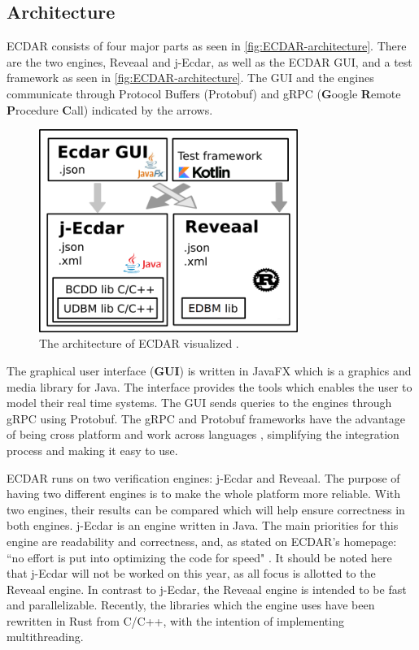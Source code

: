 \subsection{Architecture}\label{sub:architecture}
ECDAR consists of four major parts as seen in \autoref{fig:ECDAR-architecture}.
There are the two engines, Reveaal and j-Ecdar, as well as the ECDAR GUI, and a test framework as seen in \autoref{fig:ECDAR-architecture}. 
The GUI and the engines communicate through Protocol Buffers (Protobuf) and gRPC (\textbf{G}oogle \textbf{R}emote \textbf{P}rocedure \textbf{C}all) indicated by the arrows.
\begin{figure}[H]
    \centering
    \includegraphics[width=0.75\textwidth]{common/figures/ArchOverview.png}
    \caption{The architecture of ECDAR visualized \cite{ECDARNET}.}
    \label{fig:ECDAR-architecture}
\end{figure}

The graphical user interface (\textbf{GUI}) is written in JavaFX \cite{ECDARNET} which is a graphics and media library for Java. 
The interface provides the tools which enables the user to model their real time systems. 
The GUI sends queries to the engines through gRPC using Protobuf. 
The gRPC and Protobuf frameworks have the advantage of being cross platform and work across languages \cite{gRPC}\cite{google_protocol_nodate}, simplifying the integration process and making it easy to use.

ECDAR runs on two verification engines: j-Ecdar and Reveaal. 
The purpose of having two different engines is to make the whole platform more reliable. 
With two engines, their results can be compared which will help ensure correctness in both engines.
j-Ecdar is an engine written in Java.
The main priorities for this engine are readability and correctness, and, as stated on ECDAR's homepage: ``no effort is put into optimizing the code for speed" \cite{ECDARNET}.
It should be noted here that j-Ecdar will not be worked on this year, as all focus is allotted to the Reveaal engine.
In contrast to j-Ecdar, the Reveaal engine is intended to be fast and parallelizable. 
Recently, the libraries which the engine uses have been rewritten in Rust from C/C++, with the intention of implementing multithreading. 

